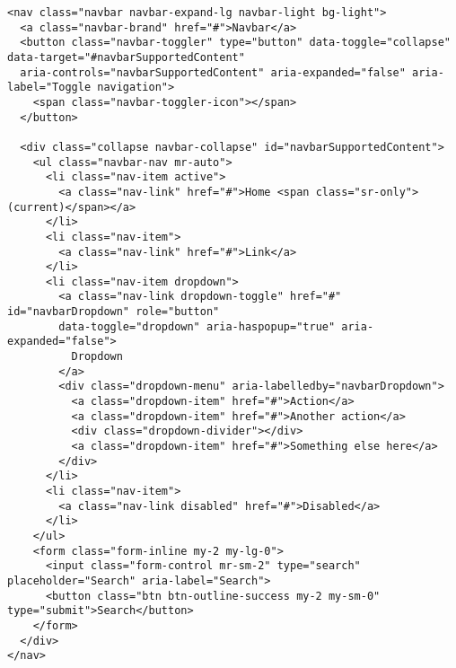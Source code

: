 {\begin{lstlisting}[frame=single, basicstyle=\tiny] 
<nav class="navbar navbar-expand-lg navbar-light bg-light">
  <a class="navbar-brand" href="#">Navbar</a>
  <button class="navbar-toggler" type="button" data-toggle="collapse" data-target="#navbarSupportedContent" 
  aria-controls="navbarSupportedContent" aria-expanded="false" aria-label="Toggle navigation">
    <span class="navbar-toggler-icon"></span>
  </button>

  <div class="collapse navbar-collapse" id="navbarSupportedContent">
    <ul class="navbar-nav mr-auto">
      <li class="nav-item active">
        <a class="nav-link" href="#">Home <span class="sr-only">(current)</span></a>
      </li>
      <li class="nav-item">
        <a class="nav-link" href="#">Link</a>
      </li>
      <li class="nav-item dropdown">
        <a class="nav-link dropdown-toggle" href="#" id="navbarDropdown" role="button" 
        data-toggle="dropdown" aria-haspopup="true" aria-expanded="false">
          Dropdown
        </a>
        <div class="dropdown-menu" aria-labelledby="navbarDropdown">
          <a class="dropdown-item" href="#">Action</a>
          <a class="dropdown-item" href="#">Another action</a>
          <div class="dropdown-divider"></div>
          <a class="dropdown-item" href="#">Something else here</a>
        </div>
      </li>
      <li class="nav-item">
        <a class="nav-link disabled" href="#">Disabled</a>
      </li>
    </ul>
    <form class="form-inline my-2 my-lg-0">
      <input class="form-control mr-sm-2" type="search" placeholder="Search" aria-label="Search">
      <button class="btn btn-outline-success my-2 my-sm-0" type="submit">Search</button>
    </form>
  </div>
</nav>
\end{lstlisting}

}
